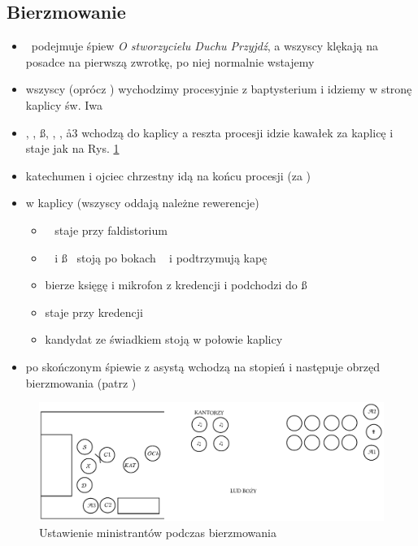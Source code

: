 \subsection{Bierzmowanie}
\begin{itemize}
	\item \ii~podejmuje śpiew \textit{O stworzycielu Duchu Przyjdź}, a wszyscy
	      klękają na posadce na pierwszą zwrotkę, po niej normalnie wstajemy
	\item wszyscy (oprócz \paschal) wychodzimy procesyjnie z baptysterium i
	      idziemy w stronę kaplicy św. Iwa
	\item \ii, \dd, \ss, , , \aa3 wchodzą do kaplicy a reszta procesji
	      idzie kawałek za kaplicę i staje jak na Rys. \ref{fig:bierzmowania}
	\item katechumen i ojciec chrzestny idą na końcu procesji (za \ii)
	\item w kaplicy (wszyscy oddają należne rewerencje)
	      \begin{itemize}
		      \item \ii~ staje przy faldistorium
		      \item \dd~ i \ss~ stoją po bokach \ii~ i podtrzymują kapę
		      \item {} bierze księgę i mikrofon z kredencji i podchodzi do
		            \ss
		      \item {} staje przy kredencji
		      \item kandydat ze świadkiem stoją w połowie kaplicy
	      \end{itemize}
	\item po skończonym śpiewie \ii z asystą wchodzą na stopień i następuje
	      obrzęd bierzmowania (patrz \textit{})
\end{itemize}
\begin{figure}[H]
	\centering
	\includegraphics[width=\linewidth]{Figures/Iwo.pdf}
	\caption{Ustawienie ministrantów podczas bierzmowania}
	\label{fig:bierzmowania}
\end{figure}
